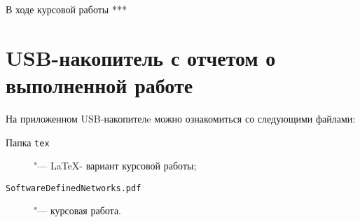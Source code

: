 \documentclass[bachelor, och, coursework]{SCWorks}
\begin{document}


\tableofcontents
\intro


\conclusion
В ходе курсовой работы *** 





\appendix
\section{USB-накопитель с отчетом о выполненной работе}\label{app:USB}
На приложенном USB-накопителe можно ознакомиться со следующими файлами:
\begin{description}
\item[Папка \texttt{tex}] "--- \LaTeX- вариант курсовой работы;
\item[\texttt{SoftwareDefinedNetworks.pdf}] "--- курсовая работа.
\end{description}
\end{document}
